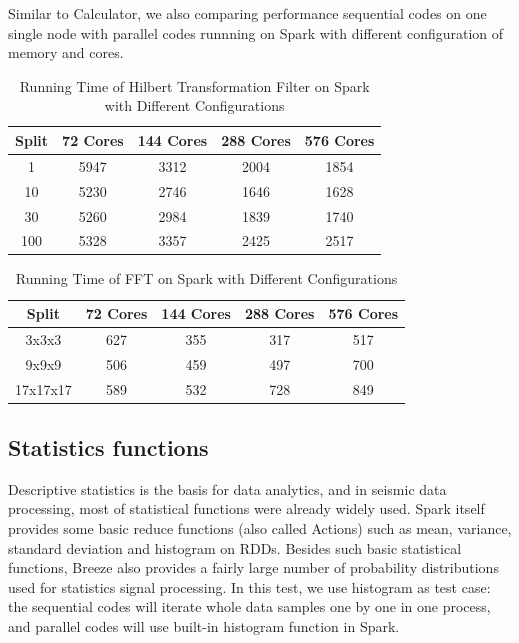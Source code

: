Similar to Calculator, we also comparing performance sequential codes on one single node with parallel codes runnning on Spark with different configuration of memory and cores. 


\begin{table}[H]
\caption{Running Time of Hilbert Transformation Filter on Spark with Different Configurations}
\centering
\begin{tabular}{||c| c c c c ||} 
 \hline
 Split & 72 Cores & 144 Cores & 288 Cores & 576 Cores \\ [0.5ex] 
 \hline
  1 & 5947 & 3312 &	2004 &	1854 \\
  10 & 5230 & 2746 &	1646 &	1628 \\
  30 & 5260 & 2984 &	1839 &	1740 \\
  100 & 5328 & 3357 &	2425 &	2517 \\
 \hline
\end{tabular}
\label{table:HilbertSpark}
\end{table}

\begin{table}[H]
\caption{Running Time of FFT on Spark with Different Configurations}
\centering
\begin{tabular}{||c| c c c c ||} 
 \hline
 Split & 72 Cores & 144 Cores & 288 Cores & 576 Cores \\ [0.5ex] 
 \hline
 3x3x3 & 627 & 355 & 317 & 517 \\ 
 9x9x9 & 506 & 459 & 497 & 700 \\
 17x17x17 & 589 & 532 & 728 & 849 \\
 \hline
 \end{tabular}
 \label{table:FFTSpark}
 \end{table}

\subsection{Statistics functions}
Descriptive statistics is the basis for data analytics, and in seismic data processing, most of statistical functions were already widely used. Spark itself provides some basic reduce functions (also called Actions) such as mean, variance, standard deviation and histogram on RDDs. Besides such basic statistical functions, Breeze also provides a fairly large number of probability distributions used for statistics signal processing. In this test, we use histogram as test case: the sequential codes will iterate whole data samples one by one in one process, and parallel codes will use built-in histogram function in Spark.

